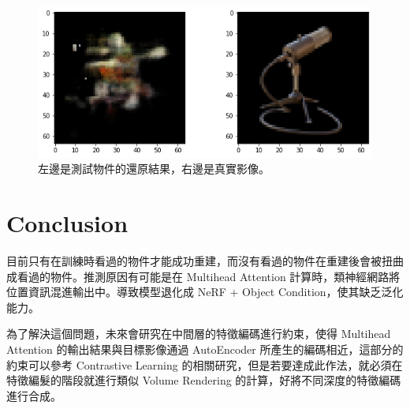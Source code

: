 \documentclass[10pt,twocolumn,letterpaper]{article}
\begin{document}
\begin{CJK}{UTF8}{bkai}
\begin{figure}
\begin{center}
         \includegraphics[width=1\linewidth]{img/experiment/test_4.png}
      \end{center}
      \caption{
         左邊是測試物件的還原結果，右邊是真實影像。
      }
      \label{fig:test_results}
   \end{figure}

   \section{Conclusion}
   目前只有在訓練時看過的物件才能成功重建，而沒有看過的物件在重建後會被扭曲成看過的物件。推測原因有可能是在
   Multihead Attention 計算時，類神經網路將位置資訊混進輸出中。導致模型退化成 NeRF + Object Condition，使其缺乏泛化能力。

   為了解決這個問題，未來會研究在中間層的特徵編碼進行約束，使得 Multihead Attention 的輸出結果與目標影像通過 AutoEncoder
   所產生的編碼相近，這部分的約束可以參考 Contrastive Learning 的相關研究，但是若要達成此作法，就必須在特徵編髮的階段就進行類似
   Volume Rendering 的計算，好將不同深度的特徵編碼進行合成。

   {\small
   
   
   }
\end{CJK}
\end{document}
